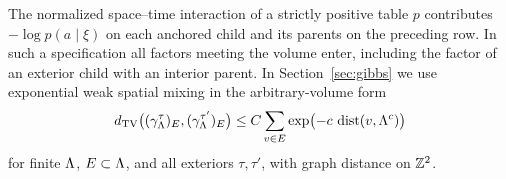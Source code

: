 The normalized space--time interaction of a strictly positive table \(p\) contributes \(-\log p(a\mid\xi)\) on each anchored child and its parents on the preceding row. In such a specification all factors meeting the volume enter, including the factor of an exterior child with an interior parent. In Section~\ref{sec:gibbs} we use exponential weak spatial mixing in the arbitrary-volume form
\begin{equation}\label{eq:wsm}
d_{\mathrm{TV}}\bigl((\gamma^\tau_\Lambda)_E,(\gamma^{\tau'}_\Lambda)_E\bigr)
\le C\sum_{v\in E}\exp\bigl(-c\,\operatorname{dist}(v,\Lambda^c)\bigr)
\end{equation}
for finite \(\Lambda\), \(E\subset\Lambda\), and all exteriors \(\tau,\tau'\), with graph distance on \(\mathbb Z^2\).
